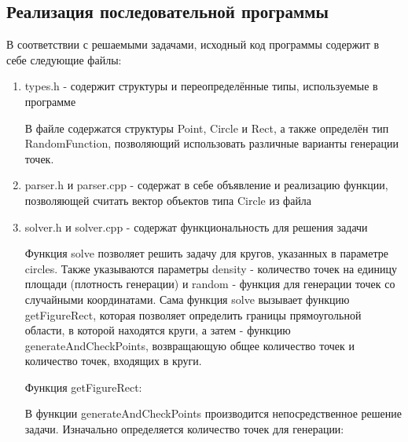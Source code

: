 \subsection{Реализация последовательной программы}

В соответствии с решаемыми задачами, исходный код программы содержит в себе следующие файлы:

\begin{enumerate}

\item types.h - содержит структуры и переопределённые типы, используемые в программе



В файле содержатся структуры Point, Circle и Rect, а также определён тип RandomFunction, позволяющий использовать различные варианты генерации точек.

\item parser.h и parser.cpp - содержат в себе объявление и реализацию функции, позволяющей считать вектор объектов типа Circle из файла



\item solver.h и solver.cpp - содержат функциональность для решения задачи



Функция solve позволяет решить задачу для кругов, указанных в параметре circles. Также указываются параметры density - количество точек на единицу площади (плотность генерации) и random - функция для генерации точек со случайными координатами. Сама функция solve вызывает функцию getFigureRect, которая позволяет определить границы прямоугольной области, в которой находятся круги, а затем - функцию generateAndCheckPoints, возвращающую общее количество точек и количество точек, входящих в круги.

Функция getFigureRect:



В функции generateAndCheckPoints производится непосредственное решение задачи. Изначально определяется количество точек для генерации:




\end{enumerate}
